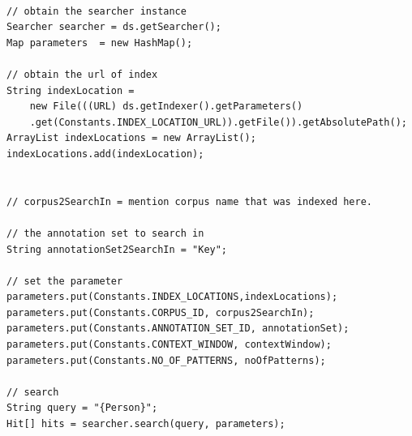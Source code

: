 \begin{lstlisting}

// obtain the searcher instance
Searcher searcher = ds.getSearcher();
Map parameters  = new HashMap();

// obtain the url of index
String indexLocation = 
	new File(((URL) ds.getIndexer().getParameters()
	.get(Constants.INDEX_LOCATION_URL)).getFile()).getAbsolutePath();
ArrayList indexLocations = new ArrayList();
indexLocations.add(indexLocation);


// corpus2SearchIn = mention corpus name that was indexed here.

// the annotation set to search in
String annotationSet2SearchIn = "Key";

// set the parameter
parameters.put(Constants.INDEX_LOCATIONS,indexLocations);
parameters.put(Constants.CORPUS_ID, corpus2SearchIn);
parameters.put(Constants.ANNOTATION_SET_ID, annotationSet);
parameters.put(Constants.CONTEXT_WINDOW, contextWindow);
parameters.put(Constants.NO_OF_PATTERNS, noOfPatterns);

// search
String query = "{Person}";
Hit[] hits = searcher.search(query, parameters);

\end{lstlisting}
